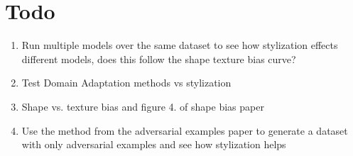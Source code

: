 \documentclass{article}
\begin{document}
\section{Todo}
\begin{enumerate}
    \item Run multiple models over the same dataset to see how stylization effects different models, does this follow the shape texture bias curve?
    \item Test Domain Adaptation methods vs stylization
    \item Shape vs. texture bias and figure 4. of shape bias paper
    \item Use the method from the adversarial examples paper to generate a dataset with only adversarial examples and see how stylization helps
\end{enumerate}
\end{document}
